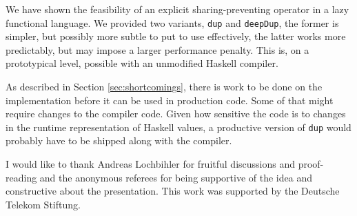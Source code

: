 \documentclass[preprint]{sigplanconf}
\theoremstyle{nonumberplain}
\newcommand{\li}{\lstinline[style=Haskell]}
\begin{document}
We have shown the feasibility of an explicit sharing-preventing operator in a lazy functional language. We provided two variants, \li-dup- and \li-deepDup-, the former is simpler, but possibly more subtle to put to use effectively, the latter works more predictably, but may impose a larger performance penalty. This is, on a prototypical level, possible with an unmodified Haskell compiler.

As described in Section \ref{sec:shortcomings}, there is work to be done on the implementation before it can be used in production code. Some of that might require changes to the compiler code. Given how sensitive the code is to changes in the runtime representation of Haskell values, a productive version of \li-dup- would probably have to be shipped along with the compiler.



\acks

I would like to thank Andreas Lochbihler for fruitful discussions and proof-reading and the anonymous referees for being supportive of the idea and constructive about the presentation. This work was supported by the Deutsche Telekom Stiftung.



\end{document}
